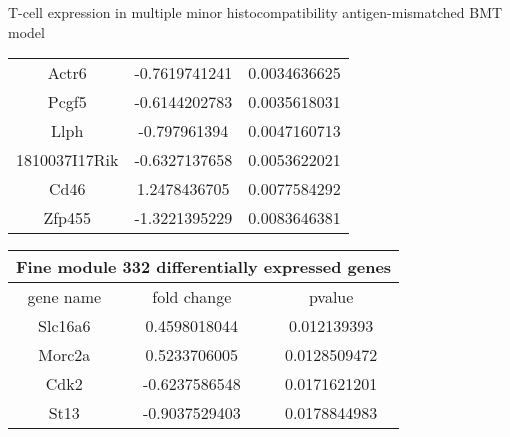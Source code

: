 \documentclass[final,hyperref={pdfpagelabels=false}]{beamer}
\begin{document}
\begin{frame}{}
\begin{columns}[t]
\begin{column}{.24\linewidth}
\begin{block}{T-cell expression in multiple minor histocompatibility antigen-mismatched BMT model}
{\begin{tabular}{ |c|c|c| }
	      Actr6 & -0.7619741241 & 0.0034636625 \\
	      Pcgf5 & -0.6144202783 & 0.0035618031 \\
	      Llph & -0.797961394 & 0.0047160713 \\
	      1810037I17Rik & -0.6327137658 & 0.0053622021 \\
	      Cd46 & 1.2478436705 & 0.0077584292 \\ %
	      Zfp455 & -1.3221395229 & 0.0083646381 \\ %
	      \hline
	    \end{tabular} }
	{\scriptsize    \begin{tabular}{ |c|c|c| } 
	    \hline
	    \multicolumn{3}{|c|}{Fine module 332 differentially expressed genes} \\
	      \hline
	      gene name & fold change & pvalue \\
	      \hline
	      Slc16a6 & 0.4598018044	& 0.012139393 \\ %
		Morc2a	& 0.5233706005	& 0.0128509472 \\ %
		Cdk2 	& -0.6237586548	& 0.0171621201 \\ %
		St13 	& -0.9037529403 & 0.0178844983 \\ %

\end{tabular}}
\end{block}
\end{column}
\end{columns}
\end{frame}
\end{document}

